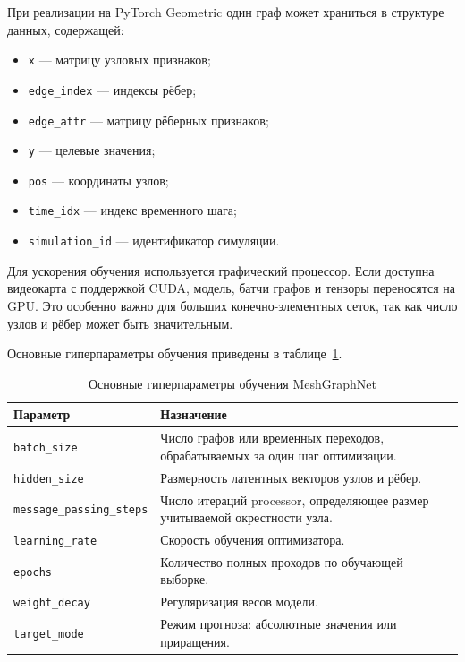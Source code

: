 При реализации на PyTorch Geometric один граф может храниться в структуре данных, содержащей:
\begin{itemize}
    \item \texttt{x} --- матрицу узловых признаков;
    \item \texttt{edge\_index} --- индексы рёбер;
    \item \texttt{edge\_attr} --- матрицу рёберных признаков;
    \item \texttt{y} --- целевые значения;
    \item \texttt{pos} --- координаты узлов;
    \item \texttt{time\_idx} --- индекс временного шага;
    \item \texttt{simulation\_id} --- идентификатор симуляции.
\end{itemize}

Для ускорения обучения используется графический процессор. Если доступна видеокарта с поддержкой CUDA, модель, батчи графов и тензоры переносятся на GPU. Это особенно важно для больших конечно-элементных сеток, так как число узлов и рёбер может быть значительным.

Основные гиперпараметры обучения приведены в таблице~\ref{tab:training_params}.

\begin{table}[h]
\centering
\caption{Основные гиперпараметры обучения MeshGraphNet}
\label{tab:training_params}
\begin{tabular}{|p{}|p{}|}
\hline
\textbf{Параметр} & \textbf{Назначение} \\
\hline
\texttt{batch\_size} & Число графов или временных переходов, обрабатываемых за один шаг оптимизации. \\
\hline
\texttt{hidden\_size} & Размерность латентных векторов узлов и рёбер. \\
\hline
\texttt{message\_passing\_steps} & Число итераций processor, определяющее размер учитываемой окрестности узла. \\
\hline
\texttt{learning\_rate} & Скорость обучения оптимизатора. \\
\hline
\texttt{epochs} & Количество полных проходов по обучающей выборке. \\
\hline
\texttt{weight\_decay} & Регуляризация весов модели. \\
\hline
\texttt{target\_mode} & Режим прогноза: абсолютные значения или приращения. \\
\hline
\end{tabular}
\end{table}

